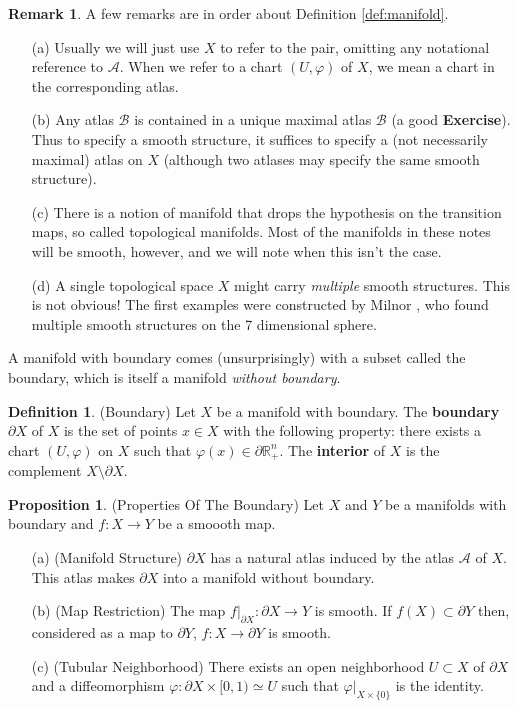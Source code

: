 \documentclass[12pt]{article}
\theoremstyle{definition}
\newtheorem{definition}[theorem]{Definition}
\newtheorem{proposition}[theorem]{Proposition}
\newtheorem{remark}[theorem]{Remark}
\numberwithin{equation}{section}
\newcommand{\R}{{\mathbb R}}
\begin{document}
 \begin{remark}  \label{rmk:def:manifold} A few remarks are in order about Definition \ref{def:manifold}.
\begin{enumerate}
 \item[(a)] Usually we will just use $X$ to refer to the pair, omitting any notational reference to $\mathcal{A}$. When we refer to a chart $(U,\varphi)$ of $X$, we mean a chart in the corresponding atlas.
 \item[(b)] Any atlas $\mathcal{B}$ is contained in a unique maximal atlas $\mathcal{B}$ (a good {\bf Exercise}). Thus to specify a smooth structure, it suffices to specify a (not necessarily maximal) atlas on $X$ (although two atlases may specify the same smooth structure).
  \item[(c)] There is a notion of manifold that drops the hypothesis on the transition maps, so called topological manifolds. Most of the manifolds in these notes will be smooth, however, and we will note when this isn't the case.
   \item[(d)] A single topological space $X$ might carry \emph{multiple} smooth structures. This is not obvious! The first examples were constructed by Milnor \cite{milnor1956}, who found multiple smooth structures on the 7 dimensional sphere.
\end{enumerate}
 \end{remark}

 A manifold with boundary comes (unsurprisingly) with a subset called the boundary, which is itself a manifold \emph{without boundary}. 

 \begin{definition} (Boundary) Let $X$ be a manifold with boundary. The {\bf boundary} $\partial X$ of $X$ is the set of points $x \in X$ with the following property: there exists a chart $(U,\varphi)$ on $X$ such that $\varphi(x) \in \partial \R^n_+$. The {\bf interior} of $X$ is the complement $X \setminus \partial X$.
 \end{definition}

\begin{proposition} (Properties Of The Boundary) Let $X$ and $Y$ be a manifolds with boundary and $f:X \to Y$ be a smoooth map. 
\begin{itemize}
	\item[(a)] (Manifold Structure) $\partial X$ has a natural atlas induced by the atlas $\mathcal{A}$ of $X$. This atlas makes $\partial X$ into a manifold without boundary.
	\item[(b)] (Map Restriction) The map $f|_{\partial X}:\partial X \to Y$ is smooth. If $f(X) \subset \partial Y$ then, considered as a map to $\partial Y$, $f:X \to \partial Y$ is smooth.
	\item[(c)] (Tubular Neighborhood) There exists an open neighborhood $U \subset X$ of $
\partial X$ and a diffeomorphism $\varphi:\partial X \times [0,1) \simeq U$ such that $\varphi|_{X \times \{0\}}$ is the identity.
\end{itemize}
\end{proposition}
\end{document}
